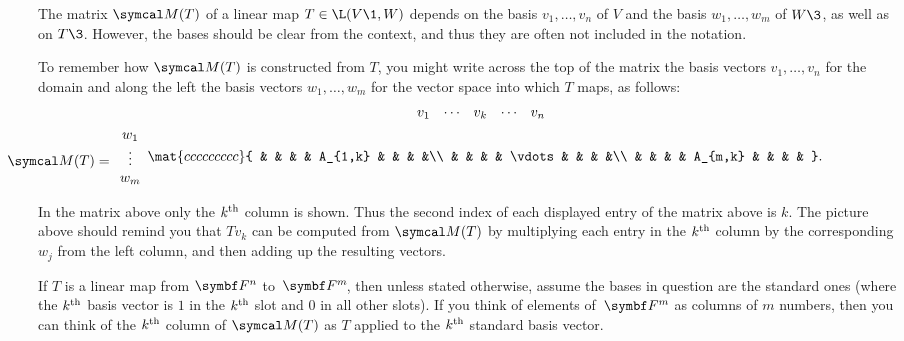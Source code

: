 The matrix $\M(T)$ of a linear map $T \in \L(V\1,W)$ depends on the basis $v_1, \dots, v_n$ of $V$ and the basis $w_1, \dots, w_m$ of $W\3$, as well as on $T\3$. However, the bases should be clear from the context, and thus they are often not included in the notation.

To remember how $\M(T)$ is constructed from $T$, you might
write across the top of the matrix the basis vectors $v_1, \dots, v_n$ for the domain and along the left the basis vectors $w_1, \dots, w_m$ for the vector space into which $T$ maps, as
follows:
\begin{gather*}
\hspace*{19bp} v_1 \Space \cdots \Space v_k \Space \cdots  \Space v_n \\
\begin{array}{c}
w_1 \\
\makebox[0in][r]{$\M(T) =$\quad\ }\vdots \\
w_m
\end{array}
\mat{ccccccccc}{
& &  & & A_{1,k} & & & &\\
& &  & & \vdots & &  & &\\
& &  & & A_{m,k} & &  & & }.
\end{gather*}


In the matrix above only the $k^{\text{{th}}}$ column is shown. Thus
the second index of each displayed entry of the matrix above is $k$. The picture above should remind you that $Tv_k$ can be computed from
$\M(T)$ by  multiplying each entry in the $k^{\text{{th}}}$ column by the
corresponding $w_j$ from  the left column, and then adding up the resulting vectors.


If $T$ is a linear map from $\F{n}$ to~$\FF{m}$, then unless stated otherwise, assume the bases in question are the standard ones (where the $k^{\text{{th}}}$ basis vector is $1$ in the $k^{\text{{th}}}$ slot and $0$ in all other  slots). If you think of elements of~$\F{m}$ as columns of $m$ numbers, then you can think of the $k^{\text{{th}}}$ column of $\M(T)$ as $T$ applied to the $k^{\text{{th}}}$ standard basis vector.

